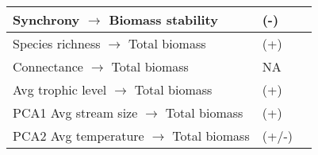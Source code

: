 \begin{tabular}{| m{7cm}| m{2cm}| m{4cm}|}
    \hline
    Synchrony $\to$ Biomass stability & (-) & \citet{thibaut_understanding_2013}\\
    \hline
    Species richness $\to$ Total biomass & (+) & \citet{schneider_animal_2016}\\
    \hline
    Connectance $\to$ Total biomass & NA & \citet{wang_biodiversity_2018}\\
    \hline
    Avg trophic level $\to$ Total biomass & (+) & \citet{wang_biodiversity_2018}\\
    \hline
    PCA1 Avg stream size $\to$ Total biomass & (+) & \citet{post_ecosystem_2000, doi_resource_2009, @allan_stream_2007}\\
    \hline
    PCA2 Avg temperature $\to$ Total biomass & (+/-) & \citep{ogorman_unexpected_2017}\\
    \hline
\end{tabular}
